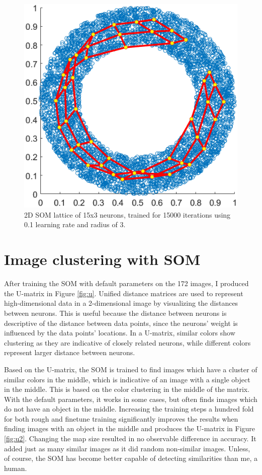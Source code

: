 \documentclass[a4paper,11pt,twocolumn]{article}
\begin{document}
\begin{figure}[!h]
  \centering
  \includegraphics[width=\linewidth/3*2]{figures/2d.png}
  \caption{2D SOM lattice of 15x3 neurons, trained for 15000 iterations using 0.1 learning rate and radius of 3.}
  \label{fig:2d}
\end{figure}

\section{Image clustering with SOM}

After training the SOM with default parameters on the 172 images, I produced the U-matrix in Figure \ref{fig:u}. Unified distance matrices are used to represent high-dimensional data in a 2-dimensional image by visualizing the distances between neurons. This is useful because the distance between neurons is descriptive of the distance between data points, since the neurons' weight is influenced by the data points' locations. In a U-matrix, similar colors show clustering as they are indicative of closely related neurons, while different colors represent larger distance between neurons. 

Based on the U-matrix, the SOM is trained to find images which have a cluster of similar colors in the middle, which is indicative of an image with a single object in the middle. This is based on the color clustering in the middle of the matrix. With the default parameters, it works in some cases, but often finds images which do not have an object in the middle. Increasing the training steps a hundred fold for both rough and finetune training significantly improves the results when finding images with an object in the middle and produces the U-matrix in  Figure \ref{fig:u2}. Changing the map size resulted in no observable difference in accuracy. It added just as many similar images as it did random non-similar images. Unless, of course, the SOM has become better capable of detecting similarities than me, a human.
\end{document}
